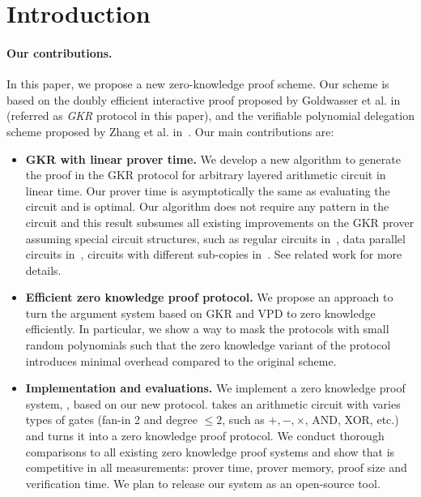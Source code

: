 \section{Introduction}\label{sec:intro}

\paragraph{Our contributions.} In this paper, we propose a new zero-knowledge proof scheme. Our scheme is based on the doubly efficient interactive proof proposed by Goldwasser et al. in~\cite{GKR} (referred as \emph{GKR} protocol in this paper), and the verifiable polynomial delegation scheme proposed by Zhang et al. in~\cite{zhang2017vsql}. Our main contributions are:
\begin{itemize}
	\item \textbf{GKR with linear prover time.} We develop a new algorithm to generate the proof in the GKR protocol for arbitrary layered arithmetic circuit in linear time. Our prover time is asymptotically the same as evaluating the circuit and is optimal. Our algorithm does not require any pattern in the circuit and this result subsumes all existing improvements on the GKR prover assuming special circuit structures, such as regular circuits in~\cite{t13}, data parallel circuits in~\cite{t13,wahby2017full}, circuits with different sub-copies in~\cite{vram}. See related work for more details. 
	\item \textbf{Efficient zero knowledge proof protocol.} We propose an approach to turn the argument system based on GKR and VPD to zero knowledge efficiently. In particular, we show a way to mask the protocols with small random polynomials such that the zero knowledge variant of the protocol introduces minimal overhead compared to the original scheme. 
	\item \textbf{Implementation and evaluations.} We implement a zero knowledge proof system, \name, based on our new protocol. \name takes an arithmetic circuit with varies types of gates (fan-in 2 and degree $\le 2$, such as $+,-,\times$, AND, XOR, etc.) and turns it into a zero knowledge proof protocol. We conduct thorough comparisons to all existing zero knowledge proof systems and show that \name is competitive in all measurements: prover time, prover memory, proof size and verification time. We plan to release our system as an open-source tool.
\end{itemize}

